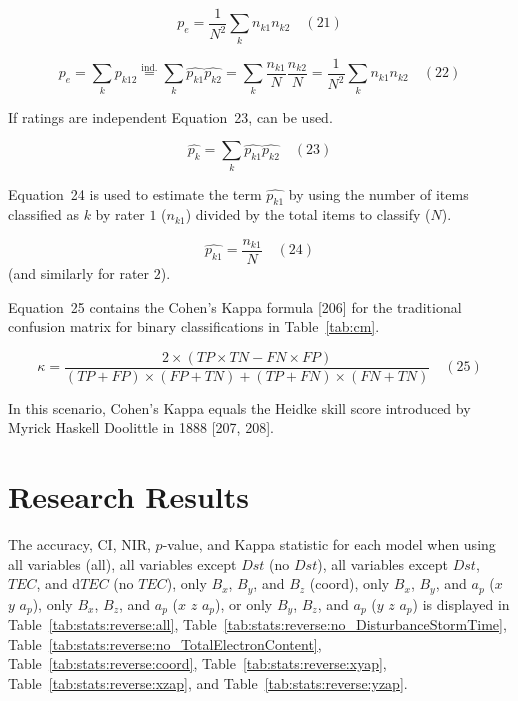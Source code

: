 \documentclass[sn-mathphys-num]{sn-jnl}%
\begin{document}
\begin{equation}
	p_{e}={\frac {1}{N^{2}}}\sum_{k}n_{k1}n_{k2}
	\quad\left(21\right)
\end{equation}

\begin{equation}
	p_{e}=\sum_{k}{\widehat {p_{k12}}}{\overset{\text{ind.}}{=}}\sum_{k}{\widehat {p_{k1}}}{\widehat {p_{k2}}}=\sum_{k}{\frac {n_{k1}}{N}}{\frac {n_{k2}}{N}}={\frac {1}{N^{2}}}\sum_{k}n_{k1}n_{k2}
	\quad\left(22\right)
\end{equation}

If ratings are independent Equation~23, can be used.

\begin{equation}
	\textstyle{\widehat{p_{k}}}=\sum_{k}{\widehat{p_{k1}}}{\widehat {p_{k2}}}
	\quad\left(23\right)
\end{equation}

Equation~24 is used to estimate the term $\widehat{p_{k1}}$ by using the number of items classified as $k$ by rater $1$ ($n_{k1}$) divided by the total items to classify ($N$).

\begin{equation}
	\widehat {p_{k1}}=\frac{n_{k1}}{N}
	\quad\left(24\right)
\end{equation}
 (and similarly for rater $2$).
 
Equation~25 contains the Cohen's Kappa formula [206] for the traditional confusion matrix for binary classifications in Table~\ref{tab:cm}.

\begin{equation}
	\kappa ={\frac{2\times (TP\times TN-FN\times FP)}{(TP+FP)\times (FP+TN)+(TP+FN)\times (FN+TN)}}
	\quad\left(25\right)
\end{equation}

In this scenario, Cohen's Kappa equals the Heidke skill score introduced by Myrick Haskell Doolittle in 1888 [207, 208].

\section{Research Results}
\label{sec:Results}

The accuracy, CI, NIR, $p$-value, and Kappa statistic for each model when using all variables (all), all variables except $Dst$ (no $Dst$), all variables except $Dst$, $TEC$, and d$TEC$ (no $TEC$), only $B_{x}$, $B_{y}$, and $B_{z}$ (coord), only $B_{x}$, $B_{y}$, and $a_{p}$ ($x$ $y$ $a_{p}$), only $B_{x}$, $B_{z}$, and $a_{p}$ ($x$ $z$ $a_{p}$), or only $B_{y}$, $B_{z}$, and $a_{p}$ ($y$ $z$ $a_{p}$) is displayed in Table~\ref{tab:stats:reverse:all}, Table~\ref{tab:stats:reverse:no_DisturbanceStormTime}, Table~\ref{tab:stats:reverse:no_TotalElectronContent}, Table~\ref{tab:stats:reverse:coord}, Table~\ref{tab:stats:reverse:xyap}, Table~\ref{tab:stats:reverse:xzap}, and Table~\ref{tab:stats:reverse:yzap}.
\end{document}
